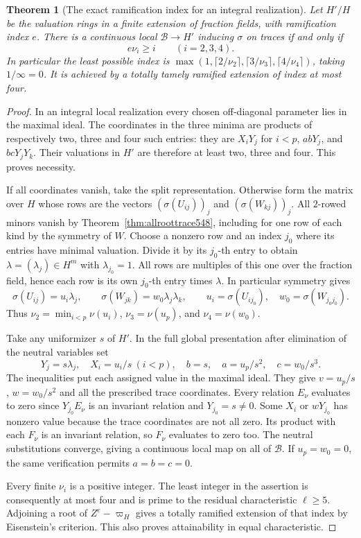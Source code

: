 \documentclass[a4paper,11pt]{article}
\newtheorem{theorem}[proposition]{Theorem}
\theoremstyle{definition}
\theoremstyle{remark}
\numberwithin{equation}{section}
\begin{document}
\begin{theorem}[The exact ramification index for an integral realization]
\leavevmode\label{thm:ramification549}
Let \(H'/H\) be the valuation rings in a finite extension of
fraction fields, with ramification index \(e\). There is a continuous
local \(\mathcal B\to H'\) inducing \(\sigma\) on traces if and only if
\[
                      e\nu_i\ge i\qquad(i=2,3,4).
\]
In particular the least possible index is
\(\max(1,\lceil2/\nu_2\rceil,\lceil3/\nu_3\rceil,
\lceil4/\nu_4\rceil)\), taking \(1/\infty=0\). It is achieved by
a totally tamely ramified extension of index at most four.
\end{theorem}
\begin{proof}
In an integral local realization every chosen off-diagonal
parameter lies in the maximal ideal. The coordinates in the
three minima are products of respectively two, three and four
such entries: they are \(X_iY_j\) for \(i<p\), \(abY_j\), and
\(bcY_jY_k\). Their valuations in \(H'\) are therefore at least
two, three and four. This proves necessity.

If all coordinates vanish, take the split representation. Otherwise
form the matrix over \(H\) whose rows are the vectors
\((\sigma(U_{ij}))_j\) and \((\sigma(W_{kj}))_j\). All \(2\)-rowed
minors vanish by Theorem~\ref{thm:allroottrace548}, including for
one row of each kind by the symmetry of \(W\). Choose a nonzero
row and an index \(j_0\) where its entries have minimal valuation.
Divide it by its \(j_0\)-th entry to obtain
\(\lambda=(\lambda_j)\in H^m\) with \(\lambda_{j_0}=1\). All rows
are multiples of this one over the fraction field, hence each
row is its own \(j_0\)-th entry times \(\lambda\). In particular
symmetry gives
\[
 \sigma(U_{ij})=u_i\lambda_j,\qquad
 \sigma(W_{jk})=w_0\lambda_j\lambda_k,\qquad
 u_i=\sigma(U_{ij_0}),\quad w_0=\sigma(W_{j_0j_0}).
\]
Thus \(\nu_2=\min_{i<p}\nu(u_i)\), \(\nu_3=\nu(u_p)\), and
\(\nu_4=\nu(w_0)\).

Take any uniformizer \(s\) of \(H'\). In the full global
presentation after elimination of the neutral variables set
\[
 Y_j=s\lambda_j,\quad X_i=u_i/s\ (i<p),\quad
 b=s,\quad a=u_p/s^2,\quad c=w_0/s^3 .
\]
The inequalities put each assigned value in the maximal ideal.
They give \(v=u_p/s\), \(w=w_0/s^2\) and all the prescribed trace
coordinates. Every relation \(E_\nu\) evaluates to zero since
\(Y_{j_0}E_\nu\) is an invariant relation and \(Y_{j_0}=s\ne0\).
Some \(X_i\) or \(wY_{j_0}\) has nonzero value because the trace
coordinates are not all zero. Its product with each \(F_\nu\)
is an invariant relation, so \(F_\nu\) evaluates to zero too.
The neutral substitutions converge, giving a continuous local
map on all of \(\mathcal B\). If \(u_p=w_0=0\), the same
verification permits \(a=b=c=0\).

Every finite \(\nu_i\) is a positive integer. The least integer
in the assertion is consequently at most four and is prime to
the residual characteristic \(\ell\ge5\). Adjoining a root of
\(Z^e-\varpi_H\) gives a totally ramified extension of that index
by Eisenstein's criterion. This also proves attainability in equal
characteristic.
\end{proof}
\end{document}
